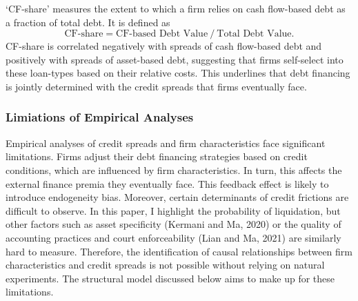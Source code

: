 \documentclass[12pt]{article}
\begin{document}
`CF-share' measures the extent to which a firm relies on cash flow-based debt as a fraction of total debt. It is defined as 
\begin{equation*}
 \text{CF-share} = \text{CF-based Debt Value} \  / \  \text{Total Debt Value}.
\end{equation*}
CF-share is correlated negatively with spreads of cash flow-based debt and positively with spreads of asset-based debt, suggesting that firms self-select into these loan-types based on their relative costs. This underlines that debt financing is jointly determined with the credit spreads that firms eventually face. 

\subsubsection{Limiations of Empirical Analyses \label{sec:credit spreads}} 
Empirical analyses of credit spreads and firm characteristics face significant limitations. Firms adjust their debt financing strategies based on credit conditions, which are influenced by firm characteristics. In turn, this affects the external finance premia they eventually face. This feedback effect is likely to introduce endogeneity bias. Moreover, certain determinants of credit frictions are difficult to observe. In this paper, I highlight the probability of liquidation, but other factors such as asset specificity (Kermani and Ma, 2020) or the quality of accounting practices and court enforceability (Lian and Ma, 2021) are similarly hard to measure. Therefore, the identification of causal relationships between firm characteristics and credit spreads is not possible without relying on natural experiments. The structural model discussed below aims to make up for these limitations. 
\end{document}
